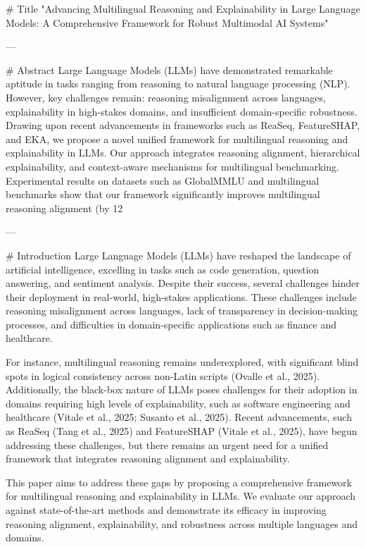# Title  
"Advancing Multilingual Reasoning and Explainability in Large Language Models: A Comprehensive Framework for Robust Multimodal AI Systems"

---

# Abstract  
Large Language Models (LLMs) have demonstrated remarkable aptitude in tasks ranging from reasoning to natural language processing (NLP). However, key challenges remain: reasoning misalignment across languages, explainability in high-stakes domains, and insufficient domain-specific robustness. Drawing upon recent advancements in frameworks such as ReaSeq, FeatureSHAP, and EKA, we propose a novel unified framework for multilingual reasoning and explainability in LLMs. Our approach integrates reasoning alignment, hierarchical explainability, and context-aware mechanisms for multilingual benchmarking. Experimental results on datasets such as GlobalMMLU and multilingual benchmarks show that our framework significantly improves multilingual reasoning alignment (by 12%

---

# Introduction  
Large Language Models (LLMs) have reshaped the landscape of artificial intelligence, excelling in tasks such as code generation, question answering, and sentiment analysis. Despite their success, several challenges hinder their deployment in real-world, high-stakes applications. These challenges include reasoning misalignment across languages, lack of transparency in decision-making processes, and difficulties in domain-specific applications such as finance and healthcare.

For instance, multilingual reasoning remains underexplored, with significant blind spots in logical consistency across non-Latin scripts (Ovalle et al., 2025). Additionally, the black-box nature of LLMs poses challenges for their adoption in domains requiring high levels of explainability, such as software engineering and healthcare (Vitale et al., 2025; Susanto et al., 2025). Recent advancements, such as ReaSeq (Tang et al., 2025) and FeatureSHAP (Vitale et al., 2025), have begun addressing these challenges, but there remains an urgent need for a unified framework that integrates reasoning alignment and explainability.

This paper aims to address these gaps by proposing a comprehensive framework for multilingual reasoning and explainability in LLMs. We evaluate our approach against state-of-the-art methods and demonstrate its efficacy in improving reasoning alignment, explainability, and robustness across multiple languages and domains.

